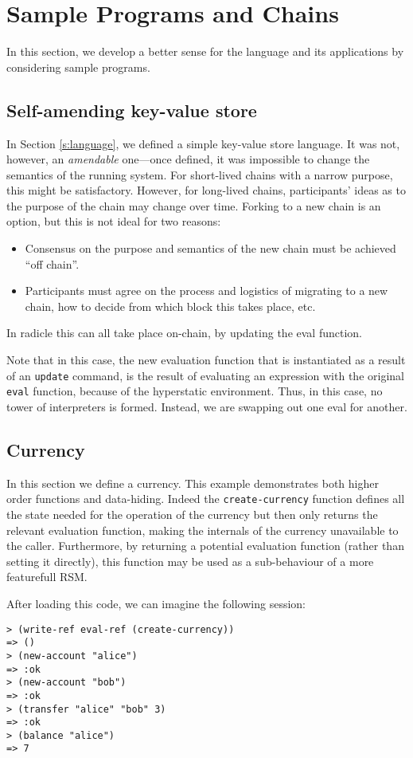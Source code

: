 \section{Sample Programs and Chains}
\label{s:examples}

In this section, we develop a better sense for the language and its
applications by considering sample programs.

\subsection{Self-amending key-value store}

In Section \ref{s:language}, we defined a simple key-value store language. It
was not, however, an \emph{amendable} one---once defined, it was impossible to
change the semantics of the running system. For short-lived chains with a narrow
purpose, this might be satisfactory. However, for long-lived chains, participants'
ideas as to the purpose of the chain may change over time. Forking to a new chain is
an option, but this is not ideal for two reasons:
\begin{itemize}
  \item Consensus on the purpose and semantics of the new chain must be achieved
    ``off chain''.
  \item Participants must agree on the process and logistics of migrating to a
    new chain, how to decide from which block this takes place, etc.
\end{itemize}
In radicle this can all take place on-chain, by updating the eval function.

Note that in this case, the new evaluation function that is instantiated as a
result of an \texttt{update} command, is the result of evaluating an
expression with the original \texttt{eval} function, because of the hyperstatic
environment. Thus, in this case, no tower of interpreters is formed. Instead,
we are swapping out one eval for another.

\subsection{Currency}

In this section we define a currency. This example demonstrates both higher
order functions and data-hiding. Indeed the \texttt{create-currency} function
defines all the state needed for the operation of the currency but then only
returns the relevant evaluation function, making the internals of the currency
unavailable to the caller. Furthermore, by returning a potential evaluation
function (rather than setting it directly), this function may be used as a
sub-behaviour of a more featurefull RSM.

After loading this code, we can imagine the following \rad{} session:
\bigskip
\begin{Verbatim}[fontsize=\small]
> (write-ref eval-ref (create-currency))
=> ()
> (new-account "alice")
=> :ok
> (new-account "bob")
=> :ok
> (transfer "alice" "bob" 3)
=> :ok
> (balance "alice")
=> 7
\end{Verbatim}

